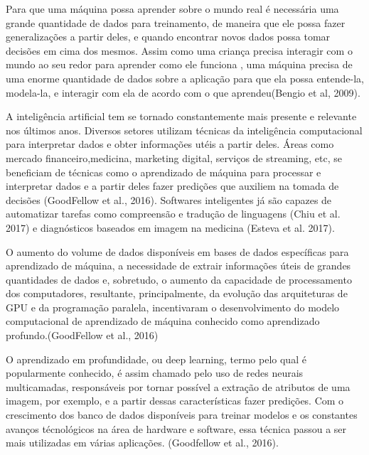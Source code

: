  	Para que uma máquina possa aprender sobre o mundo real é necessária uma grande quantidade de dados para treinamento, de maneira que ele possa fazer generalizações a partir deles, e quando encontrar novos dados possa tomar decisões em cima dos mesmos. Assim como uma criança precisa interagir com o mundo ao seu redor para aprender como ele funciona , uma máquina precisa de uma enorme quantidade de dados sobre a aplicação para que ela possa entende-la, modela-la, e interagir com ela de acordo com o que aprendeu(Bengio et al, 2009). 

 	A inteligência artificial tem se tornado constantemente mais presente e relevante nos últimos anos. Diversos setores utilizam técnicas da inteligência computacional para interpretar dados e obter informações utéis a partir deles. Áreas como mercado financeiro,medicina, marketing digital, serviços de streaming, etc, se beneficiam de técnicas como o aprendizado de máquina para processar e interpretar dados e a partir deles fazer predições que auxiliem na tomada de decisões (GoodFellow et al., 2016). Softwares inteligentes já são capazes de automatizar tarefas como compreensão e tradução de linguagens (Chiu et al. 2017) e diagnósticos baseados em imagem na medicina (Esteva et al. 2017).

O aumento do volume de dados disponíveis em bases de dados específicas para aprendizado de máquina, a necessidade de extrair informações úteis de grandes quantidades de dados e, sobretudo, o aumento da capacidade de processamento dos computadores, resultante, principalmente, da evolução das arquiteturas de GPU e da programação paralela, incentivaram o desenvolvimento do modelo computacional de aprendizado de máquina conhecido como aprendizado profundo.(GoodFellow et al., 2016) 

O aprendizado em profundidade, ou deep learning, termo pelo qual é popularmente conhecido, é assim chamado pelo uso de  redes neurais multicamadas, responsáveis por tornar possível a extração de atributos de uma imagem, por exemplo, e a partir dessas características fazer predições. Com o crescimento dos banco de dados disponíveis para treinar modelos e os constantes avanços técnológicos na área de hardware e software, essa técnica passou a ser mais utilizadas em várias aplicações. (Goodfellow et al., 2016).

